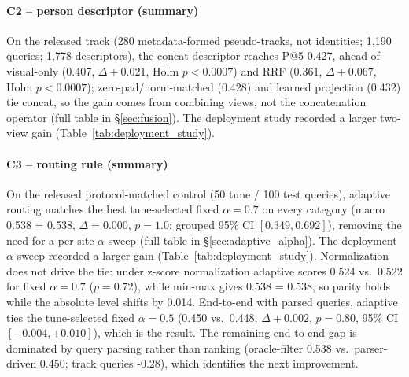 ﻿\documentclass[conference]{IEEEtran}
\theoremstyle{plain}
\begin{document}
\paragraph*{C2 -- person descriptor (summary)}
On the released track (280 metadata-formed pseudo-tracks, not identities; 1{,}190 queries; 1{,}778 descriptors), the concat descriptor reaches P@5 0.427, ahead of visual-only (0.407, $\Delta{+}0.021$, Holm $p{<}0.0007$) and RRF (0.361, $\Delta{+}0.067$, Holm $p{<}0.0007$); zero-pad/norm-matched (0.428) and learned projection (0.432) tie concat, so the gain comes from combining views, not the concatenation operator (full table in \S\ref{sec:fusion}). The deployment study recorded a larger two-view gain (Table~\ref{tab:deployment_study}).

\paragraph*{C3 -- routing rule (summary)}
On the released protocol-matched control (50 tune / 100 test queries), adaptive routing matches the best tune-selected fixed $\alpha{=}0.7$ on every category (macro 0.538 = 0.538, $\Delta{=}0.000$, $p{=}1.0$; grouped 95\% CI $[0.349,0.692]$), removing the need for a per-site $\alpha$ sweep (full table in \S\ref{sec:adaptive_alpha}). The deployment $\alpha$-sweep recorded a larger gain (Table~\ref{tab:deployment_study}). Normalization does not drive the tie: under z-score normalization adaptive scores 0.524 vs.\ 0.522 for fixed $\alpha{=}0.7$ ($p{=}0.72$), while min-max gives 0.538 = 0.538, so parity holds while the absolute level shifts by 0.014. End-to-end with parsed queries, adaptive ties the tune-selected fixed $\alpha{=}0.5$ (0.450 vs.\ 0.448, $\Delta{+}0.002$, $p{=}0.80$, 95\% CI $[-0.004,+0.010]$), which is the result. The remaining end-to-end gap is dominated by query parsing rather than ranking (oracle-filter 0.538 vs.\ parser-driven 0.450; track queries -0.28), which identifies the next improvement.
\end{document}
